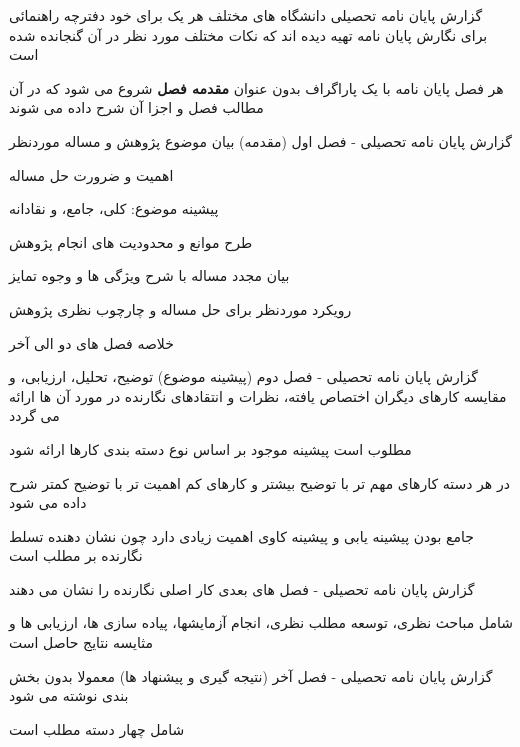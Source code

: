 \documentclass[14pt]{beamer}
\newcommand{\framefontsizelarge}{\fontsize{18pt}{0pt}\selectfont}
\newcommand{\frametitlefontsize}{\fontsize{20pt}{0pt}\selectfont}
\begin{document}
\begin{persian}
\begin{frame}[plain]{\frametitlefontsize گزارش پایان نامه تحصیلی}
		دانشگاه های مختلف هر یک برای خود دفترچه راهنمائی برای نگارش پایان نامه تهیه دیده اند که نکات مختلف مورد نظر در آن گنجانده شده است
		
		هر فصل پایان نامه با یک پاراگراف بدون عنوان \textbf{مقدمه فصل} شروع می شود که در آن مطالب فصل و اجزا آن شرح داده می شوند
	\end{frame}	
	
	\begin{frame}[plain]{\frametitlefontsize گزارش پایان نامه تحصیلی - فصل اول (مقدمه)}
		\framefontsizelarge
		بیان موضوع پژوهش و مساله موردنظر
		
		اهمیت و ضرورت حل مساله
		
		پیشینه موضوع: کلی، جامع، و نقادانه
		
		طرح موانع و محدودیت های انجام پژوهش
		
		بیان مجدد مساله با شرح ویژگی ها و وجوه تمایز
		
		رویکرد موردنظر برای حل مساله و چارچوب نظری پژوهش
		
		خلاصه فصل های دو الی آخر 
	\end{frame}	

	\begin{frame}[plain]{\frametitlefontsize گزارش پایان نامه تحصیلی - فصل دوم (پیشینه موضوع)}
		\framefontsizelarge
		توضیح، تحلیل، ارزیابی، و مقایسه کارهای دیگران اختصاص یافته، نظرات و انتقادهای نگارنده در مورد آن ها ارائه می گردد
		
		مطلوب است پیشینه موجود بر اساس نوع دسته بندی کارها ارائه شود
		
		در هر دسته کارهای مهم تر با توضیح بیشتر و کارهای کم اهمیت تر با توضیح کمتر شرح داده می شود
		
		جامع بودن پیشینه یابی و پیشینه کاوی اهمیت زیادی دارد چون نشان دهنده تسلط نگارنده بر مطلب است
	\end{frame}	
	
	\begin{frame}[plain]{\frametitlefontsize گزارش پایان نامه تحصیلی - فصل های بعدی}
		\framefontsizelarge
		کار اصلی نگارنده را نشان می دهند
		
		شامل مباحث نظری، توسعه مطلب نظری، انجام آزمایشها، پیاده سازی ها، ارزیابی ها و مثایسه نتایج حاصل است
	\end{frame}	

	\begin{frame}[plain]{\frametitlefontsize گزارش پایان نامه تحصیلی - فصل آخر (نتیجه گیری و پیشنهاد ها)}
		\framefontsizelarge
		معمولا بدون بخش بندی نوشته می شود
		
		شامل چهار دسته مطلب است
		

\end{frame}
\end{persian}
\end{document}
